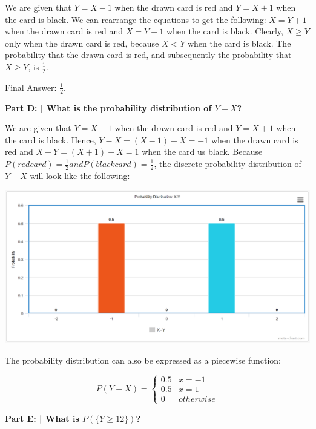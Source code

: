 \documentclass{article}
\begin{document}
 We are given that $Y = X - 1$ when the drawn card is red and $Y = X + 1$ when the card is black. We can rearrange the equations to get the following: $X = Y + 1$ when the drawn card is red and $X = Y - 1$ when the card is black. Clearly, $X \geq Y$ only when the drawn card is red, because $X < Y$ when the card is black. The probability that the drawn card is red, and subsequently the probability that $X \geq Y$, is $\frac{1}{2}$.\newline
 
 Final Answer: $\frac{1}{2}$.\newline
 
 \textbf{Part D: | What is the probability distribution of $Y-X$?}\newline
 
 We are given that $Y = X - 1$ when the drawn card is red and $Y = X + 1$ when the card is black. Hence, $Y-X = (X-1)-X=-1$ when the drawn card is red and $X-Y=(X+1)-X=1$ when the card us black. Because $P(red card) = \frac{1}{2} and P(black card) = \frac{1}{2}$, the discrete probability distribution of $Y-X$ will look like the following: \newline
 
 \includegraphics[scale=0.565]{HW4_1.PNG}
 
 The probability distribution can also be expressed as a piecewise function:
 
 \begin{displaymath}
    P(Y-X)=
    \begin{cases} 
        0.5 & x = -1 \\
        0.5 & x = 1 \\
        0 & otherwise
    \end{cases}
 \end{displaymath}
  
 \textbf{Part E: | What is $P(\{Y \geq 12\})$?}\newline
 
\end{document}
